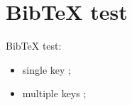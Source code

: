 \documentclass{article}
\begin{document}
\section{BibTeX test}

BibTeX test:

\begin{itemize}
    \item single key \cite{vaswani2017attention};
    \item multiple keys \cite{ATLAS:2012yve,Witten:1998qj};
\end{itemize}

\printbibliography
\end{document}
